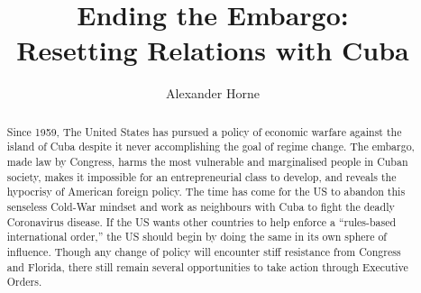 \documentclass[letterpaper,12pt,twoside]{article} %
\title{\Huge \display Ending the Embargo: \\ \LARGE \displaysubtitle Resetting Relations with Cuba}
\author{\large Alexander Horne}
\date{} %
\begin{document}
\begin{titlepage}
  \maketitle
\vfill

\renewcommand{\abstractname}{\sc\large Executive Summary}
\begin{abstract}

    Since 1959, The United States has pursued a policy of economic warfare against the island of Cuba despite it never accomplishing the goal of regime change. The embargo, made law by Congress, harms the most vulnerable and marginalised people in Cuban society, makes it impossible for an entrepreneurial class to develop, and reveals the hypocrisy of American foreign policy. The time has come for the US to abandon this senseless Cold-War mindset and work as neighbours with Cuba to fight the deadly Coronavirus disease. If the US wants other countries to help enforce a ``rules-based international order,'' the US should begin by doing the same in its own sphere of influence. Though any change of policy will encounter stiff resistance from Congress and Florida, there still remain several opportunities to take action through Executive Orders.

\end{abstract}

\end{titlepage}

{\hypersetup{hidelinks}
  \tableofcontents
}
  \vfill
  \pagebreak
\end{document}
